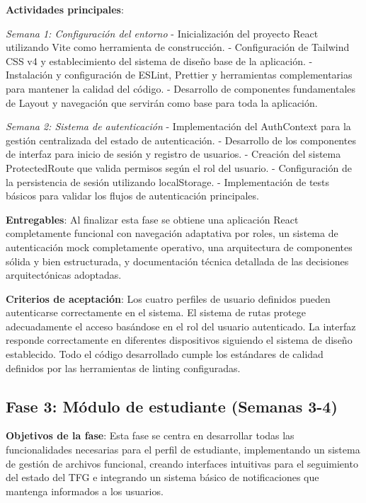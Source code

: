 \documentclass[12pt,a4paper,oneside]{report}
\begin{document}
\textbf{Actividades principales}:

\emph{Semana 1: Configuración del entorno} - Inicialización del proyecto React utilizando Vite como herramienta de construcción. - Configuración de Tailwind CSS v4 y establecimiento del sistema de diseño base de la aplicación. - Instalación y configuración de ESLint, Prettier y herramientas complementarias para mantener la calidad del código. - Desarrollo de componentes fundamentales de Layout y navegación que servirán como base para toda la aplicación.

\emph{Semana 2: Sistema de autenticación} - Implementación del AuthContext para la gestión centralizada del estado de autenticación. - Desarrollo de los componentes de interfaz para inicio de sesión y registro de usuarios. - Creación del sistema ProtectedRoute que valida permisos según el rol del usuario. - Configuración de la persistencia de sesión utilizando localStorage. - Implementación de tests básicos para validar los flujos de autenticación principales.

\textbf{Entregables}: Al finalizar esta fase se obtiene una aplicación React completamente funcional con navegación adaptativa por roles, un sistema de autenticación mock completamente operativo, una arquitectura de componentes sólida y bien estructurada, y documentación técnica detallada de las decisiones arquitectónicas adoptadas.

\textbf{Criterios de aceptación}: Los cuatro perfiles de usuario definidos pueden autenticarse correctamente en el sistema. El sistema de rutas protege adecuadamente el acceso basándose en el rol del usuario autenticado. La interfaz responde correctamente en diferentes dispositivos siguiendo el sistema de diseño establecido. Todo el código desarrollado cumple los estándares de calidad definidos por las herramientas de linting configuradas.

\subsection{Fase 3: Módulo de estudiante (Semanas
3-4)}\label{fase-3-muxf3dulo-de-estudiante-semanas-3-4}

\textbf{Objetivos de la fase}: Esta fase se centra en desarrollar todas las funcionalidades necesarias para el perfil de estudiante, implementando un sistema de gestión de archivos funcional, creando interfaces intuitivas para el seguimiento del estado del TFG e integrando un sistema básico de notificaciones que mantenga informados a los usuarios.
\end{document}
